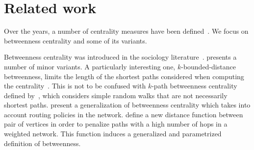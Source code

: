 \section{Related work}\label{sec:centrsamplprevwork}
Over the years, a number of centrality measures have been
defined~\citep{Newman10}. We focus on betweenness centrality and some of its variants. 

Betweenness centrality was introduced in the sociology
literature~\citep{Anthonisse71,Freeman77}. \citet{Brandes08} presents a number
of minor variants. A particularly interesting one, $k$-bounded-distance
betweenness, limits the length of the shortest paths considered when computing
the centrality~\citep{BorgattiE06,Brandes08,PfefferC12}. This is not to be
confused with $k$-path betweenness centrality defined
by~\citet{KourtellisASIT12}, which considers simple random walks that are not
necessarily shortest paths. \citet{DolevEP10} present a generalization of
betweenness centrality which takes into account routing policies in the network. %
\ifproof
\citet{OpsahlAS10} define a new distance function between pair of vertices in
order to penalize paths with a high number of hops in a weighted network. This
function induces a generalized and parametrized definition of betweenness.
\fi


